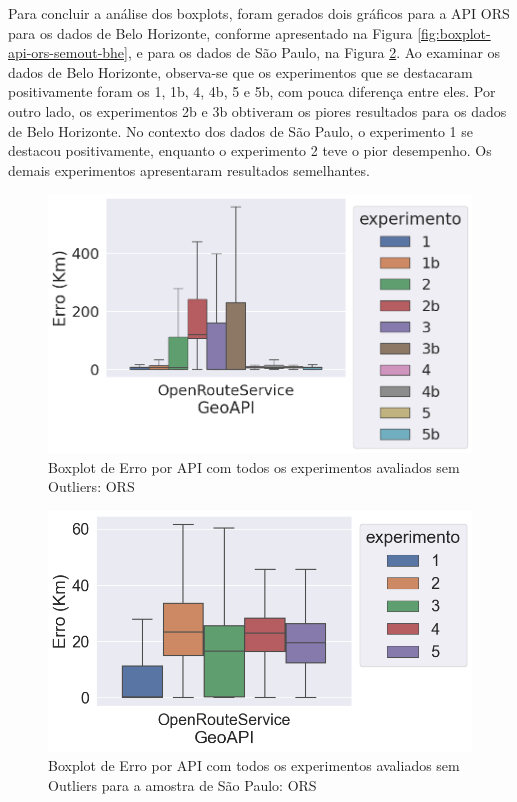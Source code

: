 Para concluir a análise dos boxplots, foram gerados dois gráficos para a API ORS para os dados de Belo Horizonte, conforme apresentado na Figura \ref{fig:boxplot-api-ors-semout-bhe}, e para os dados de São Paulo, na Figura \ref{fig:boxplot-api-ors-semout-sp}. Ao examinar os dados de Belo Horizonte, observa-se que os experimentos que se destacaram positivamente foram os 1, 1b, 4, 4b, 5 e 5b, com pouca diferença entre eles. Por outro lado, os experimentos 2b e 3b obtiveram os piores resultados para os dados de Belo Horizonte. No contexto dos dados de São Paulo, o experimento 1 se destacou positivamente, enquanto o experimento 2 teve o pior desempenho. Os demais experimentos apresentaram resultados semelhantes.

\begin{figure}[h]
    \centering
    \includegraphics[width=\textwidth]{Figuras/boxplotApiOrsSemOut.png}
    \caption{Boxplot de Erro por API com todos os experimentos avaliados sem Outliers: ORS}
    \label{fig:boxplot-api-ors-semout-bh}
\end{figure}

\begin{figure}[h]
    \centering
    \includegraphics[width=\textwidth]{Figuras/boxplotApiOrsSemOutSP.png}
    \caption{Boxplot de Erro por API com todos os experimentos avaliados sem Outliers para a amostra de São Paulo: ORS}
    \label{fig:boxplot-api-ors-semout-sp}
\end{figure}

